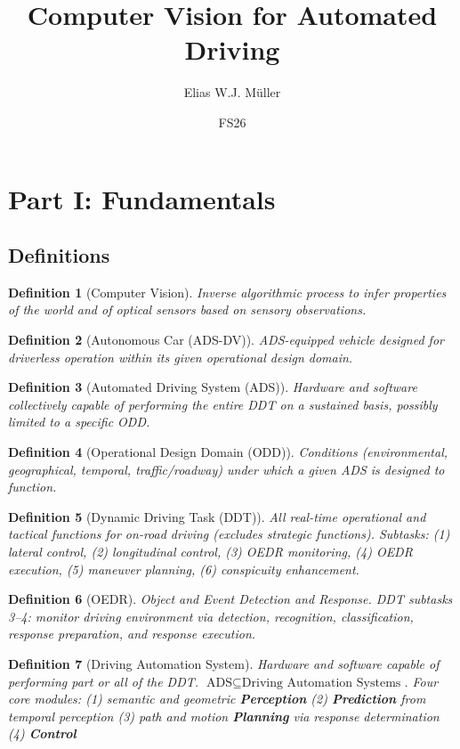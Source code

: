 \documentclass{article}
\title{Computer Vision for Automated Driving}
\author{Elias W.J. Müller}
\date{FS26}
\newtheorem{definition}{Definition}
\begin{document}
\maketitle

\tableofcontents
\newpage

\section{Part I: Fundamentals}
\subsection{Definitions}
\begin{definition}[Computer Vision]
Inverse algorithmic process to infer properties of the world and of optical sensors based on sensory observations.
\end{definition}
\begin{definition}[Autonomous Car (ADS-DV)]
ADS-equipped vehicle designed for driverless operation within its given operational design domain.
\end{definition}
\begin{definition}[Automated Driving System (ADS)]
Hardware and software collectively capable of performing the entire DDT on a sustained basis, possibly limited to a specific ODD.
\end{definition}
\begin{definition}[Operational Design Domain (ODD)]
Conditions (environmental, geographical, temporal, traffic/roadway) under which a given ADS is designed to function.
\end{definition}
\begin{definition}[Dynamic Driving Task (DDT)]
All real-time operational and tactical functions for on-road driving (excludes strategic functions). Subtasks: (1) lateral control, (2) longitudinal control, (3) OEDR monitoring, (4) OEDR execution, (5) maneuver planning, (6) conspicuity enhancement.
\end{definition}
\begin{definition}[OEDR]
Object and Event Detection and Response. DDT subtasks 3--4: monitor driving environment via detection, recognition, classification, response preparation, and response execution.
\end{definition}
\begin{definition}[Driving Automation System]
Hardware and software capable of performing part or all of the DDT. $\text{ADS} \subseteq \text{Driving Automation Systems}$. Four core modules: (1) semantic and geometric \textbf{Perception} (2) \textbf{Prediction} from temporal perception (3) path and motion \textbf{Planning} via response determination (4) \textbf{Control}
\end{definition}
\end{document}
